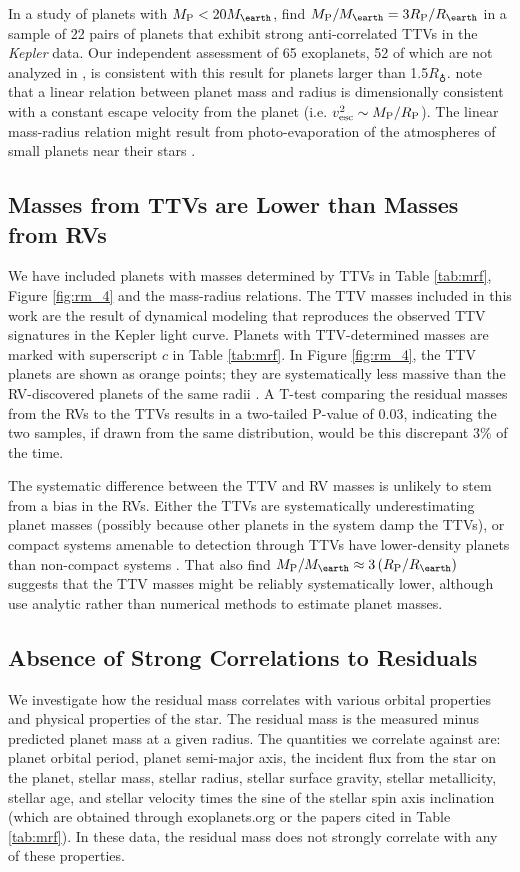 \documentclass[iop]{emulateapj}
\newcommand{\rpl}{\ensuremath{R_{\rm P}}}
\newcommand{\mpl}{\ensuremath{M_{\rm P}}}
\newcommand{\rearth}{\ensuremath{R_\earth}}
\newcommand{\mearth}{\ensuremath{M_\earth}}
\begin{document}
In a study of planets with $\mpl < 20\mearth$, \citet{WL2013} find $\mpl/\mearth = 3 \rpl/\rearth$ in a sample of 22 pairs of planets that exhibit strong anti-correlated TTVs in the \textit{Kepler} data.  Our independent assessment of 65 exoplanets, 52 of which are not analyzed in \citet{WL2013}, is consistent with this result for planets larger than 1.5\rearth.  \citet{WL2013} note that a linear relation between planet mass and radius is dimensionally consistent with a constant escape velocity from the planet (i.e. $v_{\mathrm{esc}}^2 \sim \mpl/\rpl$).  The linear mass-radius relation might result from photo-evaporation of the atmospheres of small planets near their stars \citep{Lopez2012}.

\subsection{Masses from TTVs are Lower than Masses from RVs}
We have included planets with masses determined by TTVs in Table \ref{tab:mrf}, Figure \ref{fig:rm_4} and the mass-radius relations.  The TTV masses included in this work are the result of dynamical modeling that reproduces the observed TTV signatures in the Kepler light curve.  Planets with TTV-determined masses are marked with superscript $c$ in Table \ref{tab:mrf}.  In Figure \ref{fig:rm_4}, the TTV planets are shown as orange points; they are systematically less massive than the RV-discovered planets of the same radii \citep[also see][]{Jontof-Hutter2013}.  A T-test comparing the residual masses from the RVs to the TTVs results in a two-tailed P-value of 0.03, indicating the two samples, if drawn from the same distribution, would be this discrepant 3\% of the time.

The systematic difference between the TTV and RV masses is unlikely to stem from a bias in the RVs.  Either the TTVs are systematically underestimating planet masses (possibly because other planets in the system damp the TTVs), or compact systems amenable to detection through TTVs have lower-density planets than non-compact systems \citep[e.g. the Kepler-11 system,][]{Lissauer2013}.  That \citet{WL2013} also find $\mpl/\mearth \approx 3 \left(\rpl/\rearth\right)$ suggests that the TTV masses might be reliably systematically lower, although \citet{WL2013} use analytic rather than numerical methods to estimate planet masses.

\subsection{Absence of Strong Correlations to Residuals}
We investigate how the residual mass correlates with various orbital properties and physical properties of the star.  The residual mass is the measured minus predicted planet mass at a given radius.  The quantities we correlate against are: planet orbital period, planet semi-major axis, the incident flux from the star on the planet, stellar mass, stellar radius, stellar surface gravity, stellar metallicity, stellar age, and stellar velocity times the sine of the stellar spin axis inclination (which are obtained through exoplanets.org or the papers cited in Table \ref{tab:mrf}).  In these data, the residual mass does not strongly correlate with any of these properties.
\end{document}
